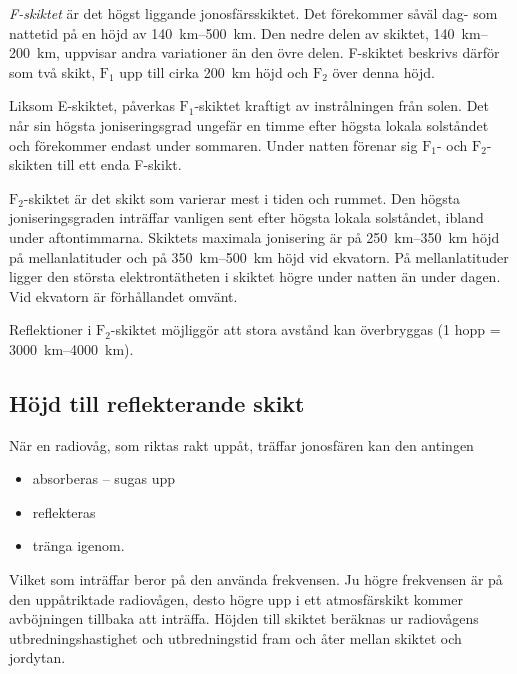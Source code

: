 \emph{F-skiktet} är det högst liggande jonosfärsskiktet.
Det förekommer såväl dag- som nattetid på en höjd av
\SIrange{140}{500}{\kilo\metre}.
Den nedre delen av skiktet, \SIrange{140}{200}{\kilo\metre}, uppvisar andra
variationer än den övre delen.
F-skiktet beskrivs därför som två skikt, \(\mathrm{F_1}\) upp till cirka
\qty{200}{\kilo\metre} höjd och \(\mathrm{F_2}\) över denna höjd.

Liksom E-skiktet, påverkas \(\mathrm{F_1}\)-skiktet kraftigt av
instrålningen från solen.
Det når sin högsta joniseringsgrad ungefär en timme efter högsta lokala
solståndet och förekommer endast under sommaren.
Under natten förenar sig \(\mathrm{F_1}\)- och \(\mathrm{F_2}\)-skikten till
ett enda F-skikt.

\(\mathrm{F_2}\)-skiktet är det skikt som varierar mest i tiden och rummet.
Den högsta joniseringsgraden inträffar vanligen sent efter högsta lokala
solståndet, ibland under aftontimmarna.
Skiktets maximala jonisering är på \SIrange{250}{350}{\kilo\metre} höjd på
mellanlatituder och på \SIrange{350}{500}{\kilo\metre} höjd vid ekvatorn.
På mellanlatituder ligger den största elektrontätheten i skiktet högre under
natten än under dagen.
Vid ekvatorn är förhållandet omvänt.

Reflektioner i \(\mathrm{F_2}\)-skiktet möjliggör att stora
avstånd kan överbryggas (1 hopp = \SIrange{3000}{4000}{\kilo\metre}).


\subsection{Höjd till reflekterande skikt}

När en radiovåg, som riktas rakt uppåt, träffar jonosfären kan den antingen
\begin{itemize}
  \item absorberas -- sugas upp
  \item reflekteras
  \item tränga igenom.
\end{itemize}

Vilket som inträffar beror på den använda frekvensen.
Ju högre frekvensen är på den uppåtriktade radiovågen, desto högre upp i ett
atmosfärskikt kommer avböjningen tillbaka att inträffa.
Höjden till skiktet beräknas ur radiovågens utbredningshastighet och
utbredningstid fram och åter mellan skiktet och jordytan.


